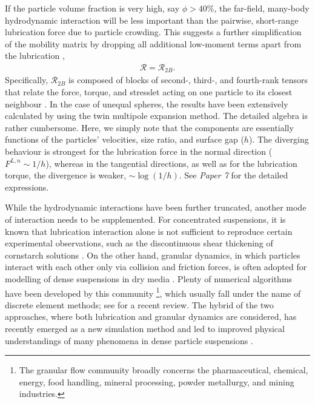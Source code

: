 If the particle volume fraction is very high, say $\phi > 40\%$, the far-field,
many-body hydrodynamic interaction will be less important than the pairwise, short-range lubrication force due to particle crowding.
This suggests a further simplification of the mobility matrix by dropping all additional low-moment terms apart from the lubrication \citep{Ball_Melrose_1997}, \ie
\begin{equation} 
 \begin{aligned}
  \mathscr{R} = \mathscr{R}_{2B} .
 \end{aligned}
\end{equation}
Specifically, $\mathscr{R}_{2B}$ is composed of blocks of second-, third-, and fourth-rank tensors that
relate the force, torque, and stresslet acting on one particle to its closest neighbour \citep{kim_karrila}.
In the case of unequal spheres, the results have been extensively calculated by \cite{jeffrey_onishi_1984, jeffrey1992} using the twin multipole expansion method.
The detailed algebra is rather cumbersome.
Here, we simply note that the components are essentially functions of the particles' velocities, size ratio, and surface gap ($h$).
The diverging behaviour is strongest for the lubrication force in the normal direction ($F^{L,n} \sim 1/h$),
whereas in the tangential directions, as well as for the lubrication torque, the divergence is weaker, $\sim \log(1/h)$.
See \emph{Paper 7} for the detailed expressions.

While the hydrodynamic interactions have been further truncated, another mode of interaction needs to be supplemented.
For concentrated suspensions, it is known that lubrication interaction alone is not sufficient to reproduce certain experimental observations,
such as the discontinuous shear thickening of cornstarch solutions \citep{Morris_annurev2020}.
On the other hand, granular dynamics, in which particles interact with each other only via collision and friction forces,
is often adopted for modelling of dense suspensions in dry media \citep{Cundall1974, Cundall_Strack1979, campbell_brennen_1985}.
Plenty of numerical algorithms have been developed by this community%
\footnote{The granular flow community broadly concerns the pharmaceutical, chemical, energy, food handling, mineral processing, powder metallurgy, and mining industries.},
which usually fall under the name of discrete element methods; see \cite{DEM_review_2015} for a recent review.
The hybrid of the two approaches, where both lubrication and granular dynamics are considered,
has recently emerged as a new simulation method and led to improved physical understandings of many phenomena in dense particle suspensions
\citep{Trulsson_Andreotti_Claudin, Seto_PRL2013, Mari_Seto_2014JoR, Cheal_Ness_2018, Ness_Mari_Cates}.

